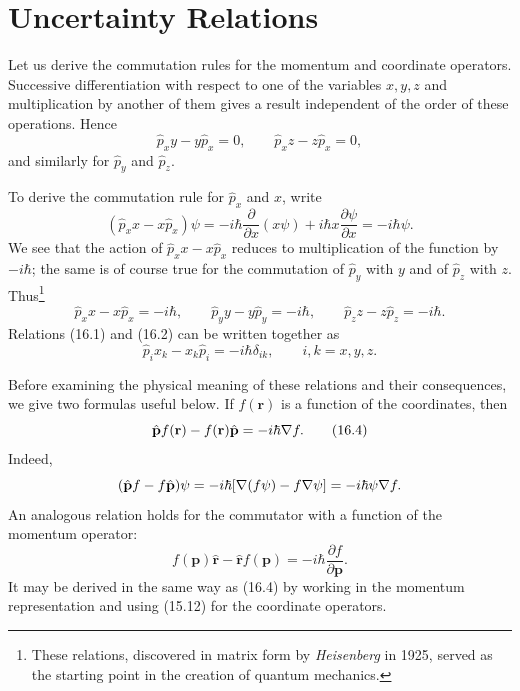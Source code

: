 \section{Uncertainty Relations}

Let us derive the commutation rules for the momentum and coordinate operators.
Successive differentiation with respect to one of the variables $x,y,z$ and
multiplication by another of them gives a result independent of the order of
these operations. Hence
\begin{equation}
  \hat p_xy-y\hat p_x=0,\qquad \hat p_xz-z\hat p_x=0,
  \tag{16.1}
\end{equation}
and similarly for $\hat p_y$ and $\hat p_z$.

To derive the commutation rule for $\hat p_x$ and $x$, write
\[
  (\hat p_xx-x\hat p_x)\psi
  =-i\hbar\frac{\partial}{\partial x}(x\psi)
  +i\hbar x\frac{\partial\psi}{\partial x}=-i\hbar\psi.
\]
We see that the action of $\hat p_xx-x\hat p_x$ reduces to multiplication of
the function by $-i\hbar$; the same is of course true for the commutation of
$\hat p_y$ with $y$ and of $\hat p_z$ with $z$. Thus\footnote{These
relations, discovered in matrix form by \emph{Heisenberg} in 1925, served as
the starting point in the creation of quantum mechanics.}
\begin{equation}
  \hat p_xx-x\hat p_x=-i\hbar,\qquad
  \hat p_yy-y\hat p_y=-i\hbar,\qquad
  \hat p_zz-z\hat p_z=-i\hbar.
  \tag{16.2}
\end{equation}
Relations (16.1) and (16.2) can be written together as
\begin{equation}
  \hat p_i x_k-x_k\hat p_i=-i\hbar\delta_{ik},
  \qquad i,k=x,y,z.
  \tag{16.3}
\end{equation}

Before examining the physical meaning of these relations and their
consequences, we give two formulas useful below. If $f(\mathbf r)$ is a
function of the coordinates, then
\begin{equation}
  \hat{\mathbf p}f(\mathbf r)-f(\mathbf r)\hat{\mathbf p}
  =-i\hbar\nabla f.
  \tag{16.4}
\end{equation}
Indeed,
\[
  (\hat{\mathbf p}f-f\hat{\mathbf p})\psi
  =-i\hbar[\nabla (f\psi)-f\nabla \psi]
  =-i\hbar\psi\nabla f.
\]
An analogous relation holds for the commutator with a function of the momentum
operator:
\begin{equation}
  f(\mathbf p)\hat{\mathbf r}-\hat{\mathbf r}f(\mathbf p)
  =-i\hbar\frac{\partial f}{\partial\mathbf p}.
  \tag{16.5}
\end{equation}
It may be derived in the same way as (16.4) by working in the momentum
representation and using (15.12) for the coordinate operators.


